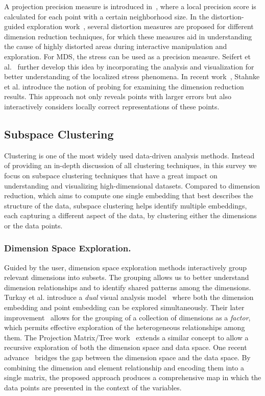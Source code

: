 A projection precision measure is introduced in~\cite{SchreckLandesbergerBremm2010}, where a local precision score is calculated for each point with a certain neighborhood size.
In the distortion-guided exploration work~\cite{LiuWangBremer2014}, several distortion measures are proposed for different dimension reduction techniques, for which these measures aid in understanding the cause of highly distorted areas during interactive manipulation and exploration.
For MDS, the stress can be used as a precision measure. Seifert et al.~\cite{SeifertSabolKienreich2010} further develop this idea by incorporating the analysis and visualization for better understanding of the localized stress phenomena.
In recent work~\cite{StahnkeDorkMuller2016}, Stahnke et al. introduce the notion of probing for examining the dimension reduction results. This approach not only reveals  points with larger errors but also interactively considers locally correct representations of these points.

\subsection{Subspace Clustering}
\label{sec_subspace}
Clustering is one of the most widely used data-driven analysis methods.
%
Instead of providing an in-depth discussion of all clustering techniques, in this survey we focus on subspace clustering techniques that have a great impact on understanding and visualizing high-dimensional datasets.
%
Compared to dimension reduction, which aims to compute one single embedding that best describes the structure of the data, subspace clustering helps identify multiple embeddings, each capturing a different aspect of the data, by clustering either the dimensions or the data points.

\subsubsection{Dimension Space Exploration.}
Guided by the user, dimension space exploration methods interactively group relevant dimensions into subsets.
%
The grouping allows us to better understand dimension relationships and to identify shared patterns among the dimensions.
%
Turkay et al. introduce a \emph{dual} visual analysis model~\cite{TurkayFilzmoserHauser2011} where both the dimension embedding and point embedding can be explored simultaneously.
%
Their later improvement~\cite{TurkayLundervoldLundervold2012} allows for the grouping of a collection of dimensions as a \emph{factor}, which permits effective exploration of the heterogeneous relationships among them.
%
The Projection Matrix/Tree work~\cite{YuanRenWang2013} extends a similar concept to allow a recursive exploration of both the dimension space and data space.
%
One recent advance~\cite{ChengMueller2016} bridges the gap between the dimension space and the data space.
%
By combining the dimension and element relationship and encoding them into a single matrix, the proposed approach produces a comprehensive map in which the data points are presented in the context of the variables.


